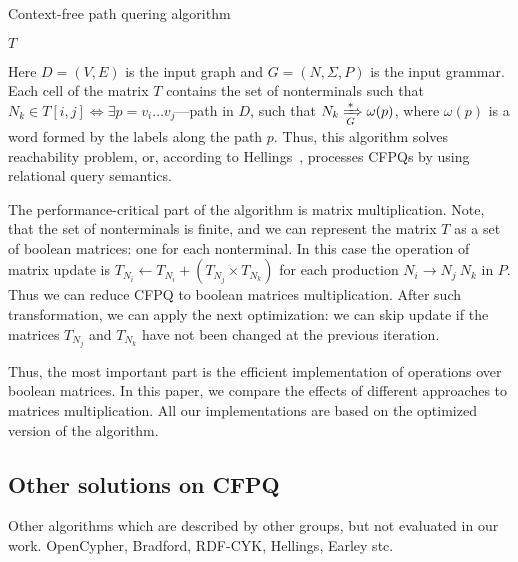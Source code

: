 \begin{algorithm}
\begin{algorithmic}[1]
\caption{Context-free path quering algorithm}
\label{lst:algo1}

    \EndFor

    \EndWhile
\State \Return $T$
\EndFunction
\end{algorithmic}
\end{algorithm}

Here $D = (V, E)$ is the input graph and $G = (N,\Sigma,P)$ is the input grammar.
Each cell of the matrix $T$ contains the set of nonterminals such that $N_k \in T[i,j] \iff \exists p = v_i \ldots v_j $---path in $D$, such that $N_k \xRightarrow[G]{*} \omega(p) $, where $\omega(p)$ is a word formed by the labels along the path $p$.
Thus, this algorithm solves reachability problem, or, according to Hellings~\cite{hellingsRelational}, processes CFPQs by using relational query semantics.

The performance-critical part of the algorithm is matrix multiplication.
Note, that the set of nonterminals is finite, and we can represent the matrix $T$ as a set of boolean matrices: one for each nonterminal.
In this case the operation of matrix update is $T_{N_i} \leftarrow T_{N_i} + (T_{N_j} \times T_{N_k})$ for each production $N_i \rightarrow N_j \ N_k$ in $P$.
Thus we can reduce CFPQ to boolean matrices multiplication.
After such transformation, we can apply the next optimization: we can skip update if the matrices $T_{N_j}$ and $T_{N_k}$ have not been changed at the previous iteration.

Thus, the most important part is the efficient implementation of operations over boolean matrices.
In this paper, we compare the effects of different approaches to matrices multiplication.
All our implementations are based on the optimized version of the algorithm.


\subsection{Other solutions on CFPQ}

Other algorithms which are described by other groups, but not evaluated in our work.
OpenCypher, Bradford, RDF-CYK, Hellings, Earley stc. 
